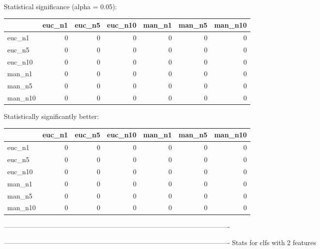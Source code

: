 Statistical significance (alpha = 0.05):
 \begin{tabular}{lrrrrrr}
\hline
         &   euc\_n1 &   euc\_n5 &   euc\_n10 &   man\_n1 &   man\_n5 &   man\_n10 \\
\hline
 euc\_n1  &        0 &        0 &         0 &        0 &        0 &         0 \\
 euc\_n5  &        0 &        0 &         0 &        0 &        0 &         0 \\
 euc\_n10 &        0 &        0 &         0 &        0 &        0 &         0 \\
 man\_n1  &        0 &        0 &         0 &        0 &        0 &         0 \\
 man\_n5  &        0 &        0 &         0 &        0 &        0 &         0 \\
 man\_n10 &        0 &        0 &         0 &        0 &        0 &         0 \\
\hline
\end{tabular} 

Statistically significantly better:
 \begin{tabular}{lrrrrrr}
\hline
         &   euc\_n1 &   euc\_n5 &   euc\_n10 &   man\_n1 &   man\_n5 &   man\_n10 \\
\hline
 euc\_n1  &        0 &        0 &         0 &        0 &        0 &         0 \\
 euc\_n5  &        0 &        0 &         0 &        0 &        0 &         0 \\
 euc\_n10 &        0 &        0 &         0 &        0 &        0 &         0 \\
 man\_n1  &        0 &        0 &         0 &        0 &        0 &         0 \\
 man\_n5  &        0 &        0 &         0 &        0 &        0 &         0 \\
 man\_n10 &        0 &        0 &         0 &        0 &        0 &         0 \\
\hline
\end{tabular} 

----------------------------------------------------------------------------------------------------



----------------------------------------------------------------------------------------------------
Stats for clfs with 2 features


